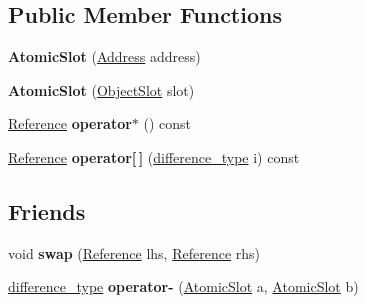 \subsection*{Public Member Functions}
\begin{DoxyCompactItemize}
\item 
\mbox{\label{classv8_1_1internal_1_1AtomicSlot_a6d6ef708b6d68106abd04fddb8cc085c}} 
{\bfseries Atomic\+Slot} (\mbox{\hyperlink{classuintptr__t}{Address}} address)
\item 
\mbox{\label{classv8_1_1internal_1_1AtomicSlot_a02cb8e75eeb0cc827852b7ffd07573c5}} 
{\bfseries Atomic\+Slot} (\mbox{\hyperlink{classv8_1_1internal_1_1ObjectSlot}{Object\+Slot}} slot)
\item 
\mbox{\label{classv8_1_1internal_1_1AtomicSlot_a131f8d2a9fb471d457488cfd0a64b1c0}} 
\mbox{\hyperlink{classv8_1_1internal_1_1AtomicSlot_1_1Reference}{Reference}} {\bfseries operator$\ast$} () const
\item 
\mbox{\label{classv8_1_1internal_1_1AtomicSlot_a4b257bff165b6658a98ccb5cddb79055}} 
\mbox{\hyperlink{classv8_1_1internal_1_1AtomicSlot_1_1Reference}{Reference}} {\bfseries operator\mbox{[}$\,$\mbox{]}} (\mbox{\hyperlink{classint}{difference\+\_\+type}} i) const
\end{DoxyCompactItemize}
\subsection*{Friends}
\begin{DoxyCompactItemize}
\item 
\mbox{\label{classv8_1_1internal_1_1AtomicSlot_acfbcbaef744b7d02648f58ade71d61ae}} 
void {\bfseries swap} (\mbox{\hyperlink{classv8_1_1internal_1_1AtomicSlot_1_1Reference}{Reference}} lhs, \mbox{\hyperlink{classv8_1_1internal_1_1AtomicSlot_1_1Reference}{Reference}} rhs)
\item 
\mbox{\label{classv8_1_1internal_1_1AtomicSlot_a561536e764ed95aa21a4b02599d80b58}} 
\mbox{\hyperlink{classint}{difference\+\_\+type}} {\bfseries operator-\/} (\mbox{\hyperlink{classv8_1_1internal_1_1AtomicSlot}{Atomic\+Slot}} a, \mbox{\hyperlink{classv8_1_1internal_1_1AtomicSlot}{Atomic\+Slot}} b)
\end{DoxyCompactItemize}
